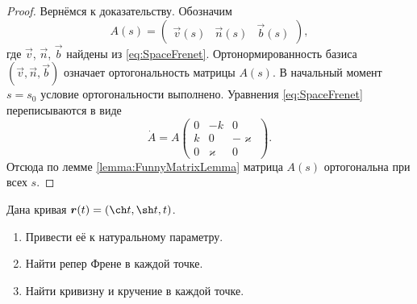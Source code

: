 \begin{proof}
	Вернёмся к доказательству. Обозначим
	\[
		A(s) = \begin{pmatrix}
			\vec{v}(s) & \vec{n}(s) & \vec{b}(s)
		\end{pmatrix},
	\]
	где $\vec{v}$, $\vec{n}$, $\vec{b}$ найдены из \eqref{eq:SpaceFrenet}. Ортонормированность базиса $(\vec{v}, \vec{n}, \vec{b})$ означает ортогональность матрицы $A(s)$. В начальный момент $s = s_0$ условие ортогональности выполнено. Уравнения \eqref{eq:SpaceFrenet} переписываются в виде
	\[
		\dot{A} = A
		\begin{pmatrix}
			0 & -k & 0\\
			k & 0 & -\varkappa\\
			0 & \varkappa & 0
		\end{pmatrix}.
	\]
	Отсюда по лемме \ref{lemma:FunnyMatrixLemma} матрица $A(s)$ ортогональна при всех $s$.
\end{proof}


\begin{problem}
	Дана кривая $\vec{r}(t) = (\ch t, \sh t, t)$.
	\begin{enumerate}[nolistsep, label=(\arabic*)]
		\item Привести её к натуральному параметру.
		\item Найти репер Френе в каждой точке.
		\item Найти кривизну и кручение в каждой точке.
	\end{enumerate}
\end{problem}

